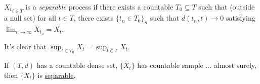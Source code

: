 
\begin{definition}[Separable]\label{def:separable}
	\({X_t}_{t\in T}\) is a \emph{separable} process if there exists a countable \(T_0 \subseteq T\) such that (outside a null set) for all \(t\in T\), there exists \(\{t_n \in T_0\}_{n}\) such that \(d(t_n, t) \to 0\) satisfying \(\lim_{n \to \infty} X_{t_n} = X_t\).
\end{definition}

It's clear that \(\sup _{t\in T_0} X_t = \sup _{t\in T} X_t\).

\begin{eg}
	If \((T, d)\) has a countable dense set, \(\{ X_t \} \) has countable sample ... almost surely, then \(\{ X_t \} \) is \hyperref[def:separable]{separable}.
\end{eg}

